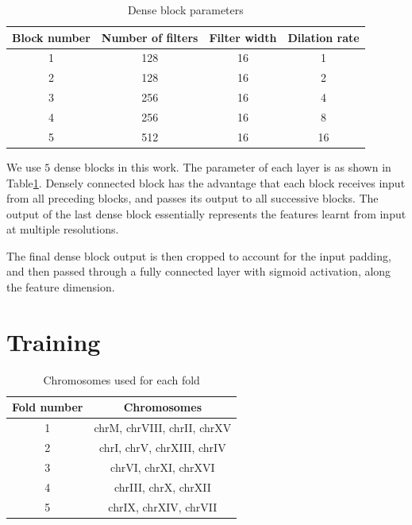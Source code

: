 \documentclass{proposal}
\begin{document}
\begin{table}[h!]
    \centering
    \begin{tabular}{||c c c c||}
        \hline
        Block number & Number of filters & Filter width & Dilation rate \\ [0.5ex]
        \hline\hline
        1 & 128 & 16 & 1 \\
        \hline
        2 & 128 & 16 & 2 \\
        \hline
        3 & 256 & 16 & 4 \\
        \hline
        4 & 256 & 16 & 8 \\
        \hline
        5 & 512 & 16 & 16 \\ [1ex]
        \hline
    \end{tabular}
    \caption{Dense block parameters}
    \label{table:conv_layer_params}
\end{table}

We use $5$ dense blocks in this work. The parameter of each layer is as shown in Table\ref{table:conv_layer_params}.
Densely connected block has the advantage that each block receives input from all preceding blocks,
and passes its output to all successive blocks.
The output of the last dense block essentially represents the features learnt from input at multiple resolutions.

The final dense block output is then cropped to account for the input padding,
and then passed through a fully connected layer with sigmoid activation, along the feature dimension.


\section{Training}


\begin{table}[h!]
    \centering
    \begin{tabular}{||c c||}
        \hline
        Fold number & Chromosomes \\ [0.5ex]
        \hline\hline
        1 & chrM, chrVIII, chrII, chrXV \\
        \hline
        2 & chrI, chrV, chrXIII, chrIV \\
        \hline
        3 & chrVI, chrXI, chrXVI \\
        \hline
        4 & chrIII, chrX, chrXII \\
        \hline
        5 & chrIX, chrXIV, chrVII \\ [1ex]
        \hline
    \end{tabular}
    \caption{Chromosomes used for each fold}
    \label{table:fold_chrom_split}
\end{table}
\end{document}
